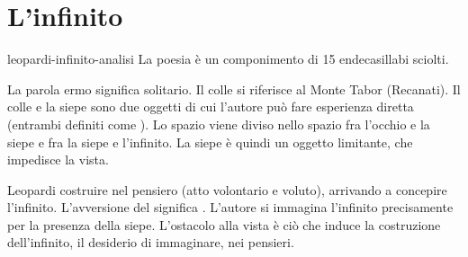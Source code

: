 \documentclass[preview]{standalone}
\begin{document}
\genpage

\section{L'infinito}


\begin{snippet}{leopardi-infinito-analisi}
    La poesia è un componimento di 15 endecasillabi sciolti. 


    La parola ermo significa solitario.
    Il colle si riferisce al Monte Tabor (Recanati).
    Il colle e la siepe sono due oggetti di cui l'autore può fare esperienza diretta
    (entrambi definiti come ).
    Lo spazio viene diviso nello spazio fra l'occhio e la siepe
    e fra la siepe e l'infinito.
    La siepe è quindi un oggetto limitante, che impedisce la vista.

    Leopardi costruire nel pensiero (atto volontario e voluto),
    arrivando a concepire l'infinito.
    L'avversione del  significa .
    L'autore si immagina l'infinito precisamente per la presenza della siepe.
    L'ostacolo alla vista è ciò che induce la costruzione dell'infinito, il desiderio
    di immaginare, nei pensieri.


\end{snippet}
\end{document}

